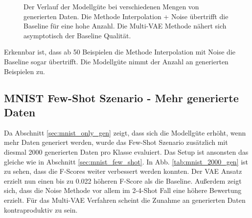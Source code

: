 \begin{figure}[H]
\centering
{}
\caption{Der Verlauf der Modellgüte bei verschiedenen Mengen von generierten Daten. Die Methode Interpolation + Noise übertrifft die Baseline für eine hohe Anzahl. Die Multi-VAE Methode nähert sich asymptotisch der Baseline Qualität.}
\label{plt:mnist_only_gen}
\end{figure}

Erkennbar ist, dass ab 50 Beispielen die Methode Interpolation mit Noise die Baseline sogar übertrifft. Die Modellgüte nimmt der Anzahl an generierten Beispielen zu.


\subsection{MNIST Few-Shot Szenario - Mehr generierte Daten}
Da Abschnitt \ref{sec:mnist_only_gen} zeigt, dass sich die Modellgüte erhöht, wenn mehr Daten generiert werden, wurde das Few-Shot Szenario zusätzlich mit diesmal 2000 generierten Daten pro Klasse evaluiert. Das Setup ist ansonsten das gleiche wie in Abschnitt \ref{sec:mnist_few_shot}. In Abb. \ref{tab:mnist_2000_gen} ist zu sehen, dass die F-Scores weiter verbessert werden konnten. Der VAE Ansatz erzielt nun einen bis zu 0.022 höheren F-Score als die Baseline. Außerdem zeigt sich, dass die Noise Methode vor allem im 2-4-Shot Fall eine höhere Bewertung erzielt. Für das Multi-VAE Verfahren scheint die Zunahme an generierten Daten kontraproduktiv zu sein.

